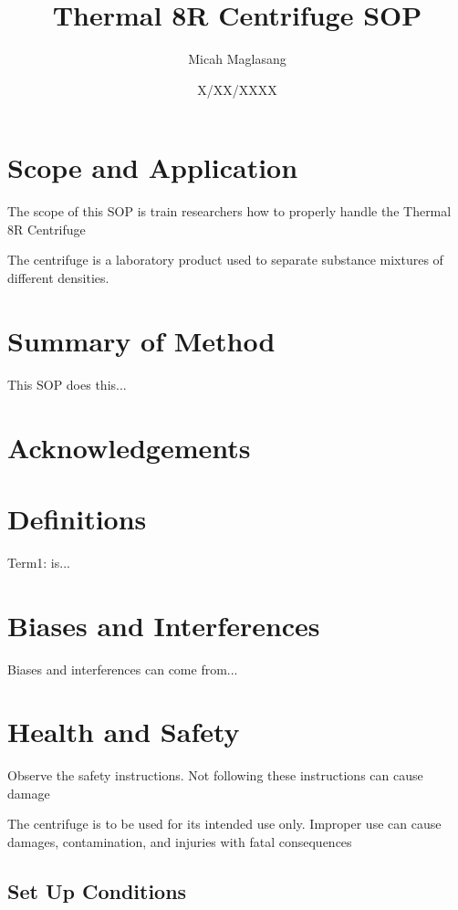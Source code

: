 \documentclass[12pt]{../SOP3_beta}
\title{Thermal 8R Centrifuge SOP}
\date{X/XX/XXXX}
\author{Micah Maglasang}
\begin{document}


\maketitle

\section{Scope and Application}

\NP The scope of this SOP is train researchers how to properly handle the Thermal 8R Centrifuge

\NP The centrifuge is a laboratory product used to separate substance mixtures of different densities.  

\section{Summary of Method}

\NP This SOP does this...

\tableofcontents

\newpage

\section{Acknowledgements}

\section{Definitions}

\NP Term1: is...

\section{Biases and Interferences}

\NP Biases and interferences can come from...

\section{Health and Safety}

\NP Observe the safety instructions. Not following these instructions can cause damage

\NP The centrifuge is to be used for its intended use only. Improper use can cause damages, contamination, and injuries with fatal consequences

\subsection*{Set Up Conditions}
\end{document}
